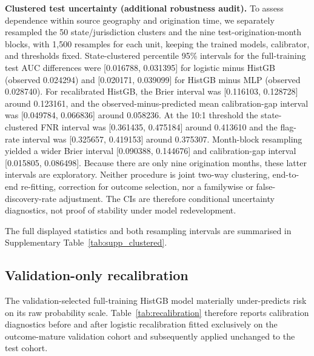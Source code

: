 \documentclass[10pt]{article}
\begin{document}
\noindent\textbf{Clustered test uncertainty (additional robustness audit).} To assess dependence within source geography and origination time, we separately resampled the 50 state/jurisdiction clusters and the nine test-origination-month blocks, with 1,500 resamples for each unit, keeping the trained models, calibrator, and thresholds fixed. State-clustered percentile 95\% intervals for the full-training test AUC differences were [0.016788, 0.031395] for logistic minus HistGB (observed 0.024294) and [0.020171, 0.039099] for HistGB minus MLP (observed 0.028740). For recalibrated HistGB, the Brier interval was [0.116103, 0.128728] around 0.123161, and the observed-minus-predicted mean calibration-gap interval was [0.049784, 0.066836] around 0.058236. At the 10:1 threshold the state-clustered FNR interval was [0.361435, 0.475184] around 0.413610 and the flag-rate interval was [0.325657, 0.419153] around 0.375307. Month-block resampling yielded a wider Brier interval [0.090388, 0.144676] and calibration-gap interval [0.015805, 0.086498]. Because there are only nine origination months, these latter intervals are exploratory. Neither procedure is joint two-way clustering, end-to-end re-fitting, correction for outcome selection, nor a familywise or false-discovery-rate adjustment. The CIs are therefore conditional uncertainty diagnostics, not proof of stability under model redevelopment.

The full displayed statistics and both resampling intervals are summarised in Supplementary Table~\ref{tab:supp_clustered}.

\subsection{Validation-only recalibration}

\label{sec:recalibration}

The validation-selected full-training HistGB model materially under-predicts risk on its raw probability scale. Table~\ref{tab:recalibration} therefore reports calibration diagnostics before and after logistic recalibration fitted exclusively on the outcome-mature validation cohort and subsequently applied unchanged to the test cohort.
\end{document}
